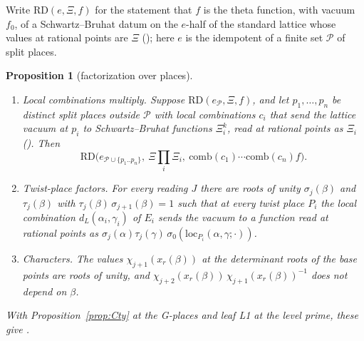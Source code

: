\documentclass[11pt]{article}
\newtheorem{proposition}[theorem]{Proposition}
\theoremstyle{definition}
\theoremstyle{remark}
\begin{document}
Write $\mathrm{RD}(e,\Xi,f)$ for the statement that $f$ is the theta function, with vacuum $f_0$, of a Schwartz--Bruhat datum on the $e$-half of the standard lattice whose values at rational points are $\Xi$ (); here $e$ is the idempotent of a finite set $\mathcal P$ of split places.

\begin{proposition}[factorization over places]\label{prop:F}
\begin{enumerate}[label=(\roman*),itemsep=2pt]
\item \emph{Local combinations multiply.} Suppose $\mathrm{RD}(e_{\mathcal P},\Xi,f)$, and let $p_1,\dots,p_n$ be distinct split places outside $\mathcal P$ with local combinations $c_i$ that send the lattice vacuum at $p_i$ to Schwartz--Bruhat functions $\Xi^{k}_i$, read at rational points as $\Xi_i$ (). Then
\[
\mathrm{RD}\Big(e_{\mathcal P\cup\{p_1..p_n\}},\ \Xi\prod_i\Xi_i,\ \mathrm{comb}(c_1)\cdots\mathrm{comb}(c_n)f\Big).
\]
\item \emph{Twist-place factors.} For every reading $J$ there are roots of unity $\sigma_j(\beta)$ and $\tau_j(\beta)$ with $\tau_j(\beta)\,\sigma_{j+1}(\beta)=1$ such that at every twist place $P_i$ the local combination $d_L(\alpha_i,\gamma_i)$ of $E_i$ sends the vacuum to a function read at rational points as $\sigma_j(\alpha)\tau_j(\gamma)\,\sigma_0(\mathrm{loc}_{P_i}(\alpha,\gamma;\cdot))$.
\item \emph{Characters.} The values $\chi_{j+1}(x_r(\beta))$ at the determinant roots of the base points are roots of unity, and $\chi_{j+2}(x_r(\beta))\,\chi_{j+1}(x_r(\beta))^{-1}$ does not depend on $\beta$.
\end{enumerate}
With Proposition~\ref{prop:Cty} at the G-places and leaf L1 at the level prime, these give .
\end{proposition}
\end{document}
